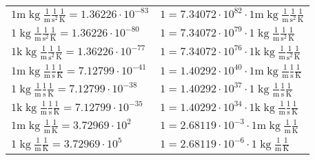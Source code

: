 \begin{center}
\begin{longtable}{l l}
{\color{gray}$1 \bm{\mathrm{ m}}\operatorname{kg}\frac1{\operatorname{m}}\frac1{\operatorname{s}^2}{}\frac1{\operatorname{K}} = 1.36226\cdot10^{-83} $}   & {\color{gray}$ 1 = 7.34072\cdot10^{82} \cdot 1 \bm{\mathrm{ m}}\operatorname{kg}\frac1{\operatorname{m}}\frac1{\operatorname{s}^2}{}\frac1{\operatorname{K}}$}  \\
{\color{black}$1 \bm{\mathrm{ }}\operatorname{kg}\frac1{\operatorname{m}}\frac1{\operatorname{s}^2}{}\frac1{\operatorname{K}} = 1.36226\cdot10^{-80} $}   & {\color{black}$ 1 = 7.34072\cdot10^{79} \cdot 1 \bm{\mathrm{ }}\operatorname{kg}\frac1{\operatorname{m}}\frac1{\operatorname{s}^2}{}\frac1{\operatorname{K}}$}  \\
{\color{gray}$1 \bm{\mathrm{ k}}\operatorname{kg}\frac1{\operatorname{m}}\frac1{\operatorname{s}^2}{}\frac1{\operatorname{K}} = 1.36226\cdot10^{-77} $}   & {\color{gray}$ 1 = 7.34072\cdot10^{76} \cdot 1 \bm{\mathrm{ k}}\operatorname{kg}\frac1{\operatorname{m}}\frac1{\operatorname{s}^2}{}\frac1{\operatorname{K}}$}  \\
{\color{gray}$1 \bm{\mathrm{ m}}\operatorname{kg}\frac1{\operatorname{m}}\frac1{\operatorname{s}}{}\frac1{\operatorname{K}} = 7.12799\cdot10^{-41} $}   & {\color{gray}$ 1 = 1.40292\cdot10^{40} \cdot 1 \bm{\mathrm{ m}}\operatorname{kg}\frac1{\operatorname{m}}\frac1{\operatorname{s}}{}\frac1{\operatorname{K}}$}  \\
{\color{black}$1 \bm{\mathrm{ }}\operatorname{kg}\frac1{\operatorname{m}}\frac1{\operatorname{s}}{}\frac1{\operatorname{K}} = 7.12799\cdot10^{-38} $}   & {\color{black}$ 1 = 1.40292\cdot10^{37} \cdot 1 \bm{\mathrm{ }}\operatorname{kg}\frac1{\operatorname{m}}\frac1{\operatorname{s}}{}\frac1{\operatorname{K}}$}  \\
{\color{gray}$1 \bm{\mathrm{ k}}\operatorname{kg}\frac1{\operatorname{m}}\frac1{\operatorname{s}}{}\frac1{\operatorname{K}} = 7.12799\cdot10^{-35} $}   & {\color{gray}$ 1 = 1.40292\cdot10^{34} \cdot 1 \bm{\mathrm{ k}}\operatorname{kg}\frac1{\operatorname{m}}\frac1{\operatorname{s}}{}\frac1{\operatorname{K}}$}  \\
{\color{gray}$1 \bm{\mathrm{ m}}\operatorname{kg}\frac1{\operatorname{m}}{}{}\frac1{\operatorname{K}} = 3.72969\cdot10^{2} $}   & {\color{gray}$ 1 = 2.68119\cdot10^{-3} \cdot 1 \bm{\mathrm{ m}}\operatorname{kg}\frac1{\operatorname{m}}{}{}\frac1{\operatorname{K}}$}  \\
{\color{black}$1 \bm{\mathrm{ }}\operatorname{kg}\frac1{\operatorname{m}}{}{}\frac1{\operatorname{K}} = 3.72969\cdot10^{5} $}   & {\color{black}$ 1 = 2.68119\cdot10^{-6} \cdot 1 \bm{\mathrm{ }}\operatorname{kg}\frac1{\operatorname{m}}{}{}\frac1{\operatorname{K}}$}  \\

\end{longtable}
\end{center}
